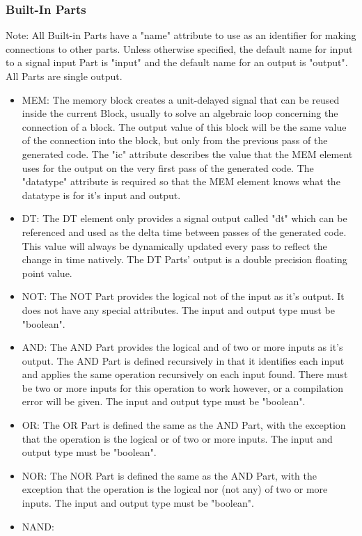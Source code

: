 \subsubsection{Built-In Parts}
Note: All Built-in Parts have a "name" attribute to use as an identifier for making connections to other parts. Unless otherwise specified, the default name for input to a signal input Part is "input" and the default name for an output is "output". All Parts are single output.
\begin{itemize}[label={}]
    \item MEM:
The memory block creates a unit-delayed signal that can be reused inside the current Block, usually to solve an algebraic loop concerning the connection of a block.
The output value of this block will be the same value of the connection into the block, but only from the previous pass of the generated code.
The "ic" attribute describes the value that the MEM element uses for the output on the very first pass of the generated code.
The "datatype" attribute is required so that the MEM element knows what the datatype is for it's input and output.
    \item DT:
The DT element only provides a signal output called "dt" which can be referenced and used as the delta time between passes of the generated code.
This value will always be dynamically updated every pass to reflect the change in time natively.
The DT Parts' output is a double precision floating point value.
    \item NOT:
The NOT Part provides the logical not of the input as it's output.
It does not have any special attributes.
The input and output type must be "boolean".
    \item AND:
The AND Part provides the logical and of two or more inputs as it's output.
The AND Part is defined recursively in that it identifies each input and applies the same operation recursively on each input found.
There must be two or more inputs for this operation to work however, or a compilation error will be given.
The input and output type must be "boolean".
    \item OR:
The OR Part is defined the same as the AND Part, with the exception that the operation is the logical or of two or more inputs.
The input and output type must be "boolean".
    \item NOR:
The NOR Part is defined the same as the AND Part, with the exception that the operation is the logical nor (not any) of two or more inputs.
The input and output type must be "boolean".
    \item NAND:

\end{itemize}
